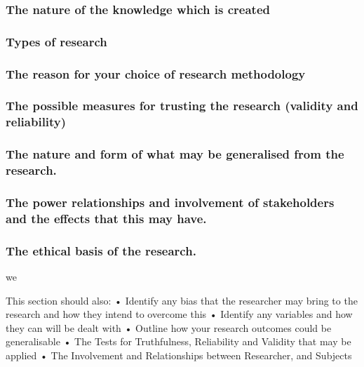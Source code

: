 \subsubsection{The nature of the knowledge which is created}
\subsubsection{Types of research}
\subsubsection{The reason for your choice of research methodology}
\subsubsection{The possible measures for trusting the research (validity and reliability)}
\subsubsection{The nature and form of what may be generalised from the research.}
\subsubsection{The power relationships and involvement of stakeholders and the effects that this may have.}
\subsubsection{The ethical basis of the research.}we

This section should also:
•	Identify any bias that the researcher may bring to the research and how they intend to overcome this
•	Identify any variables and how they can will be dealt with
•	Outline how your research outcomes could be generalisable
•	The Tests for Truthfulness, Reliability and Validity that may be applied
•	The Involvement and Relationships between Researcher, and Subjects



